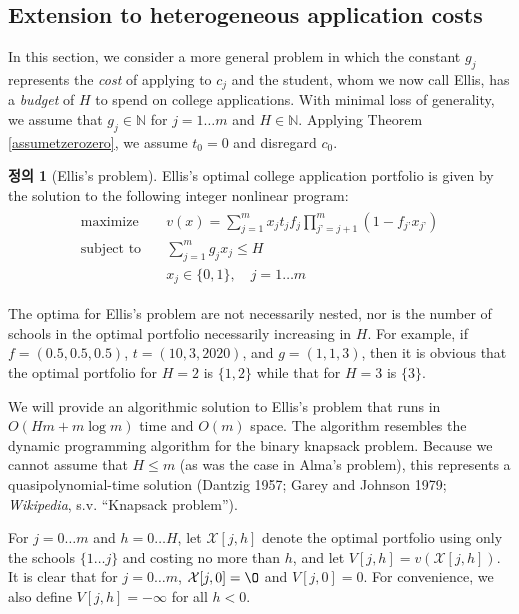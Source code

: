 \documentclass[12pt]{article} %
\theoremstyle{definition}
\newtheorem{definition}{Definition}
\theoremstyle{definition}
\newtheorem{definition}{정의}
\begin{document}
\subsection{Extension to heterogeneous application costs}
In this section, we consider a more general problem in which the constant $g_j$ represents the \emph{cost} of applying to $c_j$ and the student, whom we now call Ellis, has a \emph{budget} of $H$ to spend on college applications. With minimal loss of generality, we assume that $g_j \in \mathbb{N}$ for $j = 1\dots m$ and $H \in\mathbb{N}$. Applying Theorem \ref{assumetzerozero}, we assume $t_0 = 0$ and disregard $c_0$.

\begin{definition}[Ellis's problem]
Ellis's optimal college application portfolio is given by the solution to the following integer nonlinear program:
\begin{align}
\begin{split}
\text{maximize}\quad & v(x) = \sum_{j=1}^m x_j t_j f_j \prod_{j’ = j+1}^m (1 - f_{j’} x_{j’}) \\
\text{subject to}\quad & \sum_{j=1}^m g_j x_j \leq H \\
&x_j \in \{0, 1\}, \quad j = 1\dots m
\end{split}
\end{align}
\end{definition}

The optima for Ellis's problem are not necessarily nested, nor is the number of schools in the optimal portfolio necessarily increasing in $H$. For example, if
$f = (0.5, 0.5, 0.5)$, $t = (10, 3, 2020)$, and $g = (1, 1, 3)$,
then it is obvious that the optimal portfolio for $H = 2$ is $\{1, 2\}$ while that for $H = 3$ is $\{3\}$. 

We will provide an algorithmic solution to Ellis's problem that runs in $O(Hm + m\log m)$ time and $O(m)$ space. The algorithm resembles the dynamic programming algorithm for the binary knapsack problem. Because we cannot assume that $H \leq m$ (as was the case in Alma's problem), this represents a quasipolynomial-time solution (Dantzig 1957; Garey and Johnson 1979; \emph{Wikipedia}, s.v. ``Knapsack problem'').

For $j = 0 \dots m$ and $h = 0 \dots H$, let $\mathcal{X}[j, h]$ denote the optimal portfolio using only the schools $\{ 1 \dots j\}$ and costing no more than $h$, and let $V[j,h] = v(\mathcal{X}[j, h])$.  It is clear that for $j = 0\dots m$, $\mathcal{X}[j, 0] = \O$ and $V[j, 0] = 0$.  For convenience, we also define $V[j, h] = -\infty$ for all $h < 0$.
\end{document}
